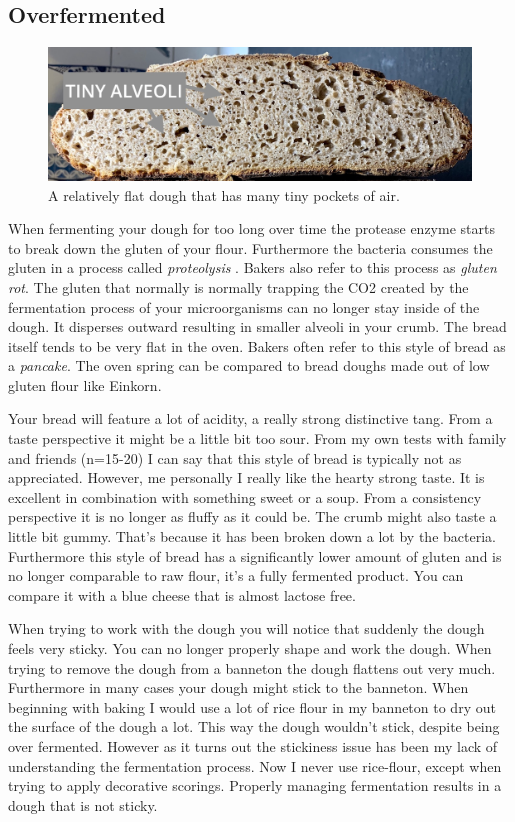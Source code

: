 \subsection{Overfermented}

\begin{figure}
  \includegraphics[width=\textwidth]{fermented-too-long}
  \caption{A relatively flat dough that has many tiny pockets of air.}
  \label{fig:fermented-too-long}
\end{figure}

When fermenting your dough for too long over time the protease enzyme starts to
break down the gluten of your flour. Furthermore the bacteria consumes the gluten
in a process called {\it proteolysis} \cite{raffaella+di+cagno}.
Bakers also refer to this process as {\it gluten rot}.
The gluten that normally is normally trapping the CO2 created
by the fermentation process of your microorganisms can no longer stay inside of
the dough. It disperses outward resulting in smaller alveoli in your crumb.
The bread itself tends to be very flat in the oven. Bakers often refer
to this style of bread as a {\it pancake}. The oven spring can be compared
to bread doughs made out of low gluten flour like Einkorn.

Your bread will feature a lot of acidity, a really strong distinctive tang. From
a taste perspective it might be a little bit too sour. From my own tests with family and
friends (n=15-20) I can say that this style of bread is typically
not as appreciated. However, me personally I really like the hearty strong taste.
It is excellent in combination with something
sweet or a soup.  From a consistency perspective it is no longer as fluffy as it could be.
The crumb might also taste a little bit gummy. That's because it has been broken down a lot
by the bacteria. Furthermore this style of bread has a significantly lower amount of gluten \cite{raffaella+di+cagno}
and is no longer comparable to raw flour, it's a fully fermented product.
You can compare it with a blue cheese that is almost lactose free.

When trying to work with the dough you will notice that suddenly the dough feels
very sticky. You can no longer properly shape and work the dough. When trying to
remove the dough from a banneton the dough flattens out very much. Furthermore
in many cases your dough might stick to the banneton. When beginning with baking
I would use a lot of rice flour in my banneton to dry out the surface of the dough a lot.
This way the dough wouldn't stick, despite being over fermented. However as it
turns out the stickiness issue has been my lack of understanding the fermentation
process. Now I never use rice-flour, except when trying to apply decorative scorings.
Properly managing fermentation results in a dough that is not sticky.

